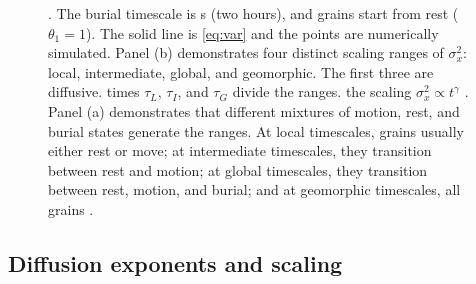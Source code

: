 \begin{figure}[!htbp]
{{}\DIFdelendFL . The burial timescale is \DIFdelbeginFL {}\DIFdelendFL \DIFaddbeginFL {}\DIFaddendFL s (two hours), and grains start from rest ($\theta_1=1$). The solid line is \DIFdelbeginFL {}\DIFdelendFL \DIFaddbeginFL {}\DIFaddendFL \ref{eq:var} \DIFdelbeginFL \DIFdelFL{), }\DIFdelendFL and the points are numerically simulated. Panel (b) demonstrates four distinct scaling ranges of $\sigma_x^2$: local, intermediate, global, and geomorphic. The first three are diffusive. \DIFdelbeginFL {}\DIFdelendFL \DIFaddbeginFL {}\DIFaddendFL times $\tau_L$, $\tau_I$, and $\tau_G$ divide the ranges. \DIFdelbeginFL {}\DIFdelendFL \DIFaddbeginFL {}\DIFaddendFL the scaling $\sigma_x^2 \propto t^\gamma$ \DIFaddbeginFL {}\DIFaddendFL . Panel (a) demonstrates that different mixtures of motion, rest, and burial states generate the ranges. At local timescales, grains usually either rest or move; at intermediate timescales, they transition between rest and motion; at global timescales, they transition between rest, motion, and burial; and at geomorphic timescales, all grains \DIFdelbeginFL {}\DIFdelendFL \DIFaddbeginFL {}\DIFaddendFL .
	}
	\label{fig:diffvar}
\end{figure}

\subsection{Diffusion exponents and \DIFdelbegin {}\DIFdelend \DIFaddbegin {}\DIFaddend scaling}
\DIFaddbegin \label{sec:amidonenow}
\DIFaddend 

